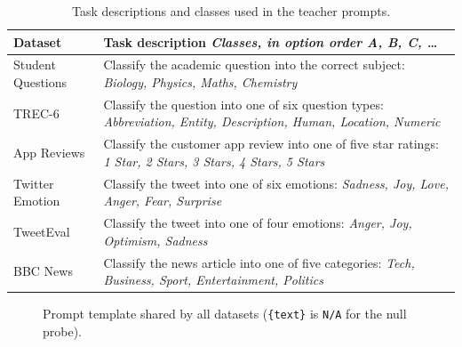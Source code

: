\documentclass[11pt]{article}
\begin{document}
\begin{table}[!ht]
\centering
\small
\begin{tabular}{>{\raggedright\arraybackslash}p{}>{\raggedright\arraybackslash}p{}}
\toprule
\textbf{Dataset} & \textbf{Task description} \newline \textit{Classes, in option order A, B, C, \ldots} \\
\midrule
Student Questions & Classify the academic question into the correct subject: \newline \textit{Biology, Physics, Maths, Chemistry} \\[3pt]
TREC-6 & Classify the question into one of six question types: \newline \textit{Abbreviation, Entity, Description, Human, Location, Numeric} \\[3pt]
App Reviews & Classify the customer app review into one of five star ratings: \newline \textit{1 Star, 2 Stars, 3 Stars, 4 Stars, 5 Stars} \\[3pt]
Twitter Emotion & Classify the tweet into one of six emotions: \newline \textit{Sadness, Joy, Love, Anger, Fear, Surprise} \\[3pt]
TweetEval & Classify the tweet into one of four emotions: \newline \textit{Anger, Joy, Optimism, Sadness} \\[3pt]
BBC News & Classify the news article into one of five categories: \newline \textit{Tech, Business, Sport, Entertainment, Politics} \\[3pt]
\bottomrule
\end{tabular}
\caption{Task descriptions and classes used in the teacher prompts.}
\label{tab:prompts}
\end{table}

\begin{figure}[!ht]
\centering
{}
\caption{Prompt template shared by all datasets (\texttt{\{text\}} is \texttt{N/A} for the null probe).}
\label{fig:app_prompt_template}
\end{figure}
\end{document}
